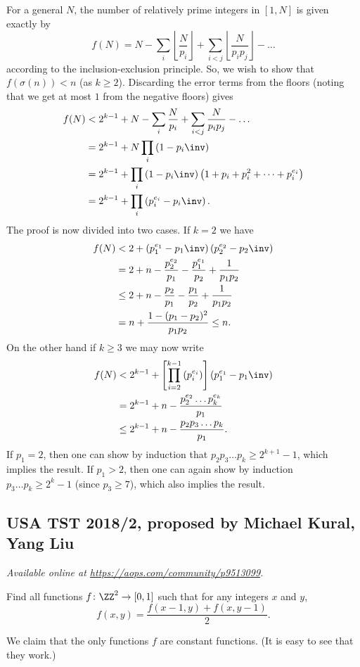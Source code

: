 \documentclass[11pt]{scrartcl}
\begin{document}
For a general $N$, the number of relatively prime integers in $[1,N]$ is
given exactly by
\[ f(N) = N - \sum_i \left\lfloor \frac{N}{p_i} \right\rfloor
  + \sum_{i<j} \left\lfloor \frac{N}{p_i p_j} \right\rfloor - \dots \]
according to the inclusion-exclusion principle.
So, we wish to show that $f(\sigma(n)) < n$ (as $k \ge 2$).
Discarding the error terms from the floors
(noting that we get at most $1$ from the negative floors)
gives
\begin{align*}
  f(N) &< 2^{k-1} + N - \sum_i \frac{N}{p_i}
    + \sum_{i<j} \frac{N}{p_i p_j} - \dots \\
  &= 2^{k-1} + N \prod_i \left( 1 - p_i\inv \right) \\
  &= 2^{k-1} + \prod_i \left( 1 - p_i\inv \right)
    \left( 1 + p_i + p_i^2 + \dots + p_i^{e_i} \right) \\
  &= 2^{k-1} + \prod_i \left( p_i^{e_i} - p_i\inv \right).
\end{align*}
The proof is now divided into two cases.
If $k=2$ we have
\begin{align*}
  f(N) &< 2 + \left( p_1^{e_1} - p_1\inv \right)\left( p_2^{e_2} -
  p_2\inv \right) \\
  &= 2 + n - \frac{p_2^{e_2}}{p_1} - \frac{p_1^{e_1}}{p_2}
    + \frac{1}{p_1p_2} \\
  &\le 2 + n - \frac{p_2}{p_1} - \frac{p_1}{p_2}
    + \frac{1}{p_1p_2} \\
  &= n + \frac{1-(p_1-p_2)^2}{p_1p_2} \le n.
\end{align*}
On the other hand if $k \ge 3$ we may now write
\begin{align*}
  f(N) &< 2^{k-1} + \left[ \prod_{i=2}^{k-1} \left( p_i^{e_i} \right)
    \right] \left( p_1^{e_1} - p_1\inv \right) \\
  &= 2^{k-1} + n - \frac{p_2^{e_2} \dots p_k^{e_k}}{p_1} \\
  &\le 2^{k-1} + n - \frac{p_2 p_3 \dots p_k}{p_1}.
\end{align*}
If $p_1 = 2$, then one can show
by induction that $p_2 p_3 \dots p_k \ge 2^{k+1}-1$,
which implies the result.
If $p_1 > 2$, then one can again show by induction
$p_3 \dots p_k \ge 2^k-1$ (since $p_3 \ge 7$),
which also implies the result.
\pagebreak

\subsection{USA TST 2018/2, proposed by Michael Kural, Yang Liu}
\textsl{Available online at \url{https://aops.com/community/p9513099}.}
\begin{mdframed}[style=mdpurplebox,frametitle={Problem statement}]
Find all functions $f \colon \ZZ^2 \to [0,1]$
such that for any integers $x$ and $y$,
\[ f(x, y) = \frac{f(x-1, y) + f(x, y-1)}{2}. \]
\end{mdframed}
We claim that the only functions $f$ are constant functions.
(It is easy to see that they work.)
\end{document}
